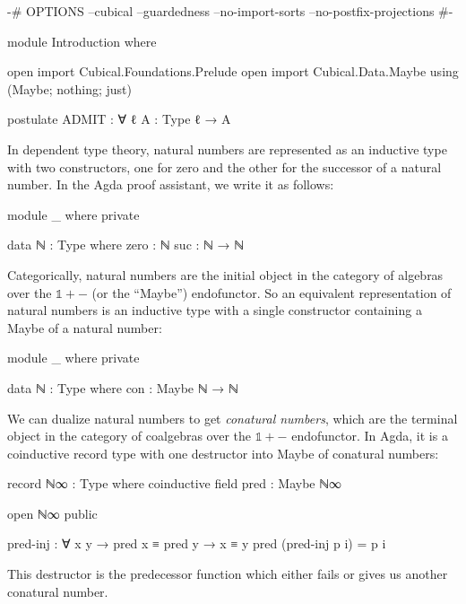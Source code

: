 \begin{code}[hide]
{-# OPTIONS --cubical --guardedness --no-import-sorts --no-postfix-projections #-}

module Introduction where

open import Cubical.Foundations.Prelude
open import Cubical.Data.Maybe using (Maybe; nothing; just)

postulate
  ADMIT : ∀ {ℓ} {A : Type ℓ} → A
\end{code}
In dependent type theory, natural numbers are represented as an inductive type
with two constructors, one for zero and the other for the successor of a natural
number. In the Agda proof assistant, we write it as follows:
\begin{code}[hide]
module _ where private
\end{code}
\begin{code}
  data ℕ : Type where
    zero  : ℕ
    suc   : ℕ → ℕ
\end{code}
Categorically, natural numbers are the initial object in the category of
algebras over the $\mathbb{1} + {-}$ (or the ``Maybe'') endofunctor. So an
equivalent representation of natural numbers is an inductive type with a single
constructor containing a Maybe of a natural number:
\begin{code}[hide]
module _ where private
\end{code}
\begin{code}
  data ℕ : Type where
    con : Maybe ℕ → ℕ
\end{code}

We can dualize natural numbers to get \emph{conatural numbers}, which are the
terminal object in the category of coalgebras over the $\mathbb{1} + {-}$
endofunctor. In Agda, it is a coinductive record type with one destructor into
Maybe of conatural numbers:
\begin{code}
record ℕ∞ : Type where
  coinductive
  field
    pred : Maybe ℕ∞
\end{code}
\begin{code}[hide]
open ℕ∞ public

pred-inj : ∀ {x y} → pred x ≡ pred y → x ≡ y
pred (pred-inj p i) = p i
\end{code}
This destructor is the predecessor function which either fails or gives us
another conatural number.

